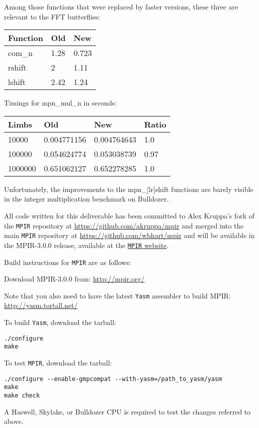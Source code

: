 Among those functions that were replaced by faster versions, these three
are relevant to the FFT butterflies:

\begin{longtable}[c]{@{}lll@{}}
\toprule
Function & Old & New\tabularnewline
\midrule
\endhead
com\_n & 1.28 & 0.723\tabularnewline
rshift & 2 & 1.11\tabularnewline
lshift & 2.42 & 1.24\tabularnewline
\bottomrule
\end{longtable}

Timings for mpn\_mul\_n in seconds:

\begin{longtable}[c]{@{}llll@{}}
\toprule
Limbs & Old & New & Ratio\tabularnewline
\midrule
\endhead
10000 & 0.004771156 & 0.004764643 & 1.0\tabularnewline
100000 & 0.054624774 & 0.053038739 & 0.97\tabularnewline
1000000 & 0.651062127 & 0.652278285 & 1.0\tabularnewline
\bottomrule
\end{longtable}

Unfortunately, the improvements to the mpn\_{[}lr{]}shift functions are
barely visible in the integer multiplication benchmark on Bulldozer.

All code written for this deliverable has been committed to Alex
Kruppa's fork of the \texttt{MPIR} repository at
\url{https://github.com/akruppa/mpir} and merged into the main
\texttt{MPIR} repository at \url{https://github.com/wbhart/mpir} and
will be available in the MPIR-3.0.0 release, available at the
\href{http://mpir.org/}{\texttt{MPIR} website}.

Build instructions for \texttt{MPIR} are as follows:

Download MPIR-3.0.0 from: \href{http://mpir.org}{http://mpir.org/}

Note that you also need to have the latest \texttt{Yasm} assembler to
build MPIR: \url{http://yasm.tortall.net/}

To build \texttt{Yasm}, download the tarball:

\begin{verbatim}
./configure
make
\end{verbatim}

To test \texttt{MPIR}, download the tarball:

\begin{verbatim}
./configure --enable-gmpcompat --with-yasm=/path_to_yasm/yasm
make
make check
\end{verbatim}

A Haswell, Skylake, or Bulldozer CPU is required to test the changes
referred to above.
